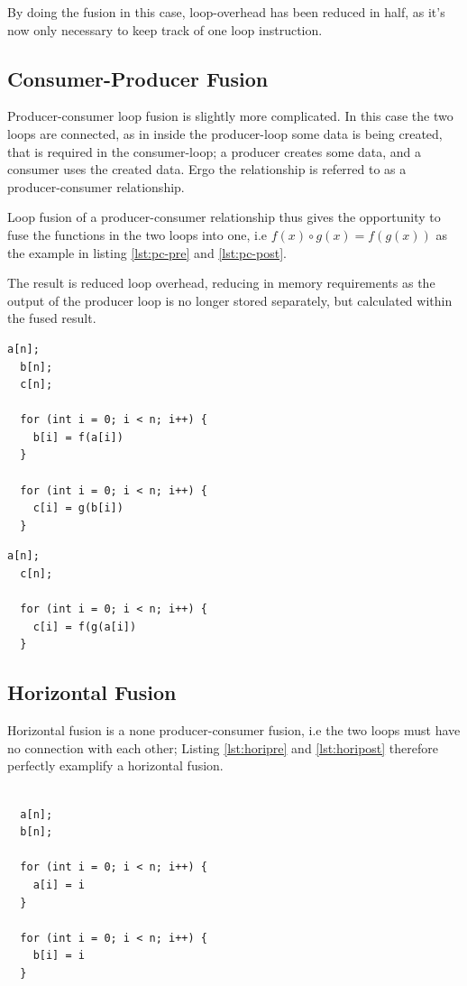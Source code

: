 \documentclass[11pt,bibliography=totocnumbered]{article}
\begin{document}
By doing the fusion in this case, loop-overhead has been reduced in half, as it's now only necessary to keep track of one loop instruction.

\subsection{Consumer-Producer Fusion}
Producer-consumer loop fusion is slightly more complicated. In this case the two loops are connected, as in inside the producer-loop some data is being created, that is required in the consumer-loop; a producer creates some data, and a consumer uses the created data.
 Ergo the relationship is referred to as a producer-consumer relationship.

Loop fusion of a producer-consumer relationship thus gives the opportunity to fuse the functions in the two loops into one, i.e $f(x) \circ g(x) = f(g(x))$ as the example in listing \ref{lst:pc-pre} and \ref{lst:pc-post}.

The result is reduced loop overhead, reducing in memory requirements as the output of the producer loop is no longer stored separately, but calculated within the fused result.

\begin{lstlisting}[caption=Producer-Consumer pre-fusion.,label={lst:pc-pre}] 
  a[n];
  b[n];
  c[n];
  	  
  for (int i = 0; i < n; i++) {
    b[i] = f(a[i])
  }
  
  for (int i = 0; i < n; i++) {
    c[i] = g(b[i])
  }
\end{lstlisting}

\begin{lstlisting}[caption=Producer-Consumer post-fusion.,label={lst:pc-post}] 
  a[n];
  c[n];
  	  
  for (int i = 0; i < n; i++) {
    c[i] = f(g(a[i])
  }
\end{lstlisting}

\subsection{Horizontal Fusion}
Horizontal fusion is a none producer-consumer fusion, i.e the two loops must have no connection with each other; Listing \ref{lst:horipre} and \ref{lst:horipost} therefore perfectly examplify a horizontal fusion.  
\begin{lstlisting}[caption=Pre-fusion,label={lst:horipre}]

  a[n];
  b[n];

  for (int i = 0; i < n; i++) {
    a[i] = i
  }

  for (int i = 0; i < n; i++) {
    b[i] = i
  }
\end{lstlisting}
\end{document}
